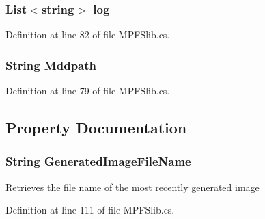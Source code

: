 \subsubsection[{log}]{\setlength{\rightskip}{0pt plus 5cm}List$<$string$>$ log\hspace{0.3cm}{\ttfamily [protected]}}\label{class_microchip_1_1_m_p_f_s_builder_a31a8312feb632071ed26469c2f3b0591}


Definition at line 82 of file M\+P\+F\+Slib.\+cs.

\hypertarget{class_microchip_1_1_m_p_f_s_builder_a62437d97e6140d62bcdb357ca9a3d10e}{}
\subsubsection[{Mddpath}]{\setlength{\rightskip}{0pt plus 5cm}String Mddpath\hspace{0.3cm}{\ttfamily [protected]}}\label{class_microchip_1_1_m_p_f_s_builder_a62437d97e6140d62bcdb357ca9a3d10e}


Definition at line 79 of file M\+P\+F\+Slib.\+cs.



\subsection{Property Documentation}
\hypertarget{class_microchip_1_1_m_p_f_s_builder_aa5d595675bc1157c4418af50c2683023}{}
\subsubsection[{Generated\+Image\+File\+Name}]{\setlength{\rightskip}{0pt plus 5cm}String Generated\+Image\+File\+Name\hspace{0.3cm}{\ttfamily [get]}}\label{class_microchip_1_1_m_p_f_s_builder_aa5d595675bc1157c4418af50c2683023}


Retrieves the file name of the most recently generated image 



Definition at line 111 of file M\+P\+F\+Slib.\+cs.

